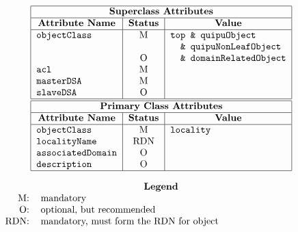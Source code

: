 
\smaller

\[\begin{tabular}{|l|c|l|}
\hline
\multicolumn{3}{|c|}{\bf Superclass Attributes}\\
\hline
\multicolumn{1}{|c|}{\bf Attribute Name}&
			\multicolumn{1}{c|}{\bf Status}&
				\multicolumn{1}{c|}{\bf Value}\\
\hline
\verb"objectClass"&	M&	\verb"top & quipuObject"\\
&			&	\verb"  & quipuNonLeafObject"\\
&			O&	\verb"  & domainRelatedObject"\\
\verb"acl"&		M&	\\
\verb"masterDSA"&	M&	\\
\verb"slaveDSA"&	O&	\\
\hline
\hline
\multicolumn{3}{|c|}{\bf Primary Class Attributes}\\
\hline
\multicolumn{1}{|c|}{\bf Attribute Name}&
			\multicolumn{1}{c|}{\bf Status}&
				\multicolumn{1}{c|}{\bf Value}\\
\hline
\verb"objectClass"&	M&	\verb"locality"\\
\verb"localityName"&	RDN&	\\
\verb"associatedDomain"&
			O&	\\
\verb"description"&	O&	\\
\hline
\end{tabular}\]

\[\begin{tabular}{rp{4in}}
\multicolumn{2}{c}{\bf Legend}\\
M:&	mandatory\\
O:&	optional, but recommended\\
RDN:&	mandatory, must form the RDN for object
\end{tabular}\]
